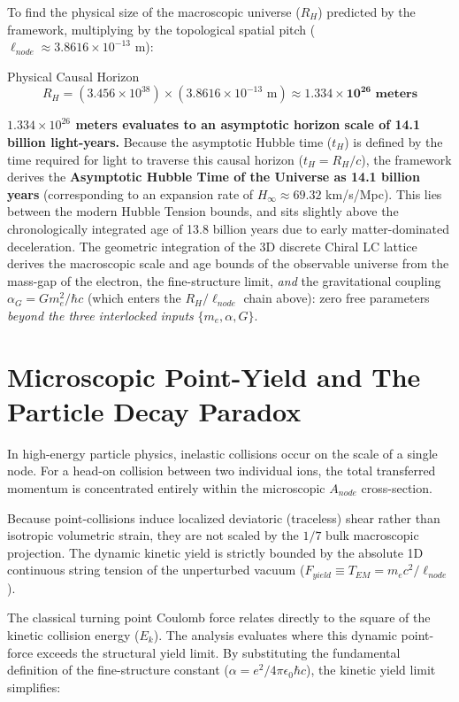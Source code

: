 To find the physical size of the macroscopic universe ($R_H$) predicted by the framework, multiplying by the topological spatial pitch ($\ell_{node} \approx 3.8616 \times 10^{-13}\text{ m}$):
\begin{resultbox}{Physical Causal Horizon}
\begin{equation}
R_H = (3.456 \times 10^{38}) \times (3.8616 \times 10^{-13}\text{ m}) \approx \mathbf{1.334 \times 10^{26}\text{ meters}}
\end{equation}
\end{resultbox}

\textbf{$1.334 \times 10^{26}$ meters evaluates to an asymptotic horizon scale of 14.1 billion light-years.} Because the asymptotic Hubble time ($t_H$) is defined by the time required for light to traverse this causal horizon ($t_H = R_H/c$), the framework derives the \textbf{Asymptotic Hubble Time of the Universe as 14.1 billion years} (corresponding to an expansion rate of $H_\infty \approx 69.32$ km/s/Mpc). This lies between the modern Hubble Tension bounds, and sits slightly above the chronologically integrated age of 13.8 billion years due to early matter-dominated deceleration. The geometric integration of the 3D discrete Chiral LC lattice derives the macroscopic scale and age bounds of the observable universe from the mass-gap of the electron, the fine-structure limit, \emph{and} the gravitational coupling $\alpha_{G}=Gm_{e}^{2}/\hbar c$ (which enters the $R_{H}/\ell_{node}$ chain above): zero free parameters \emph{beyond the three interlocked inputs} $\{m_{e},\alpha,G\}$.

\section{Microscopic Point-Yield and The Particle Decay Paradox}

In high-energy particle physics, inelastic collisions occur on the scale of a single node. For a head-on collision between two individual ions, the total transferred momentum is concentrated entirely within the microscopic $A_{node}$ cross-section.

Because point-collisions induce localized deviatoric (traceless) shear rather than isotropic volumetric strain, they are not scaled by the $1/7$ bulk macroscopic projection. The dynamic kinetic yield is strictly bounded by the absolute 1D continuous string tension of the unperturbed vacuum ($F_{yield}\equiv T_{EM}=m_{e}c^{2}/\ell_{node}$).

The classical turning point Coulomb force relates directly to the square of the kinetic collision energy ($E_{k}$). The analysis evaluates where this dynamic point-force exceeds the structural yield limit. By substituting the fundamental definition of the fine-structure constant ($\alpha=e^{2}/4\pi\epsilon_{0}\hbar c$), the kinetic yield limit simplifies:

